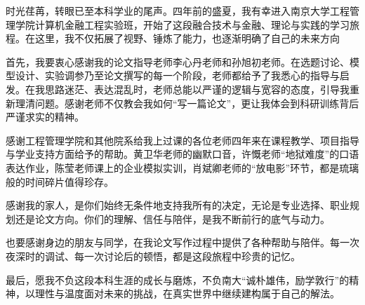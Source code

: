 \documentclass[
    type = bachelor, %
    decl-page,  %
    oneside,                %
  ]{njuthesis}
\begin{document}
%   
%   









\printbibliography


\begin{acknowledgement}
  
  
时光荏苒，转眼已至本科学业的尾声。四年前的盛夏，我有幸进入南京大学工程管理学院计算机金融工程实验班，开始了这段融合技术与金融、理论与实践的学习旅程。在这里，我不仅拓展了视野、锤炼了能力，也逐渐明确了自己的未来方向

首先，我要衷心感谢我的论文指导老师李心丹老师和孙旭初老师。在选题讨论、模型设计、实验调参乃至论文撰写的每一个阶段，老师都给予了我悉心的指导与启发。在我思路迷茫、表达混乱时，老师总能以严谨的逻辑与宽容的态度，引导我重新理清问题。感谢老师不仅教会我如何“写一篇论文”，更让我体会到科研训练背后严谨求实的精神。

感谢工程管理学院和其他院系给我上过课的各位老师四年来在课程教学、项目指导与学业支持方面给予的帮助。黄卫华老师的幽默口音，许慨老师“地狱难度”的口语表达作业，陈莹老师课上的企业模拟实训，肖斌卿老师的“放电影”环节，都是琉璃般的时间碎片值得珍存。

感谢我的家人，是你们始终无条件地支持我所有的决定，无论是专业选择、职业规划还是论文方向。你们的理解、信任与陪伴，是我不断前行的底气与动力。

也要感谢身边的朋友与同学，在我论文写作过程中提供了各种帮助与陪伴。每一次夜深时的调试、每一次讨论后的顿悟，都是这段旅程中珍贵的记忆。

最后，愿我不负这段本科生涯的成长与磨炼，不负南大“诚朴雄伟，励学敦行”的精神，以理性与温度面对未来的挑战，在真实世界中继续建构属于自己的解法。
  
\end{acknowledgement}




\appendix





\end{document}
